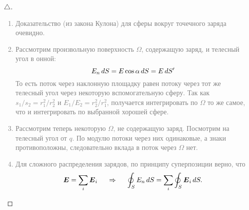 \begin{proof}[$\triangle$]
\textcolor{grey}{
    \begin{minipage}[t]{0.9\textwidth}
        \begin{enumerate}[label = \Roman*.]
            \item Доказательство (из закона Кулона) для сферы вокруг точечного заряда очевидно. 
            \item Рассмотрим произвольную поверхность $\Omega$, содержащую заряд, и телесный угол в онной:
            $$
                E_n \, d S = E \cos \alpha \, d S = E \, d S' 
            $$
            То есть поток через наклонную площадку равен потоку через тот же телесный угол через некоторую вспомогательную сферу. Так как $s_1 / s_2 = r_1^2 / r_2^2$ и $E_1 / E_2 = r_2^2/r_1^2$, получается интегрировать по $\Omega$ то же самое, что и интегрировать по выбранной хорошей сфере. 
            \item Рассмотрим теперь некоторую $\Omega$, не содержащую заряд. Посмотрим на телесный угол от $q$. По модулю потоки через них одинаковые, а знаки противоположны, следовательно вклада в поток через $\Omega$ нет.
            \item Для сложного распределения зарядов, по принципу суперпозиции верно, что
            $$
                \mbox{\boldmath $E$} = \sum_i \mbox{\boldmath $E$}_i
                \hspace{0.5cm} \Rightarrow \hspace{0.5cm} 
                \oint_S E_n \, d S = \sum_i \oint_S \mbox{\boldmath $E$}_i \, d S.
            $$
        \end{enumerate}
    \end{minipage}
}

\phantom{42}
\end{proof}



